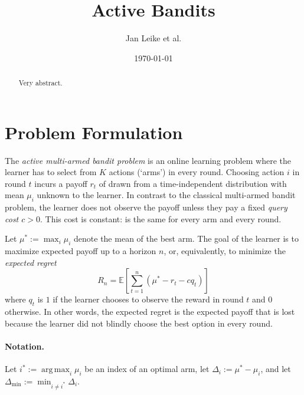\documentclass[a4paper]{article}
\DeclareMathOperator*{\argmax}{arg\,max} %
\begin{document}

\title{Active Bandits}
\author{Jan Leike et al.}
\date{\today}

\maketitle


\begin{abstract}
Very abstract.
\end{abstract}


\section{Problem Formulation}

The \emph{active multi-armed bandit problem} is
an online learning problem
where the learner has to select from $K$ actions (`arms') in every round.
Choosing action $i$ in round $t$ incurs a payoff
$r_t$ of drawn from a time-independent distribution with mean $\mu_i$
unknown to the learner.
In contrast to the classical multi-armed bandit problem,
the learner does not observe the payoff
unless they pay a fixed \emph{query cost $c > 0$}.
This cost is constant: is the same for every arm and every round.

Let $\mu^* := \max_i \mu_i$ denote the mean of the best arm.
The goal of the learner is to maximize expected payoff up to a horizon $n$,
or, equivalently, to minimize the \emph{expected regret}
\[
R_n = \mathbb{E} \left[ \sum_{t=1}^n (\mu^* - r_t - c q_t) \right]
\]
where $q_t$ is $1$ if the learner chooses to observe the reward in round $t$ and $0$ otherwise.
In other words, the expected regret is the expected payoff
that is lost
because the learner did not blindly choose the best option in every round.

\paragraph{Notation.}
Let $i^* := \argmax_i \mu_i$ be an index of an optimal arm,
let $\Delta_i := \mu^* - \mu_i$, and
let $\Delta_{\min} := \min_{i \neq i^*} \Delta_i$.
\end{document}
